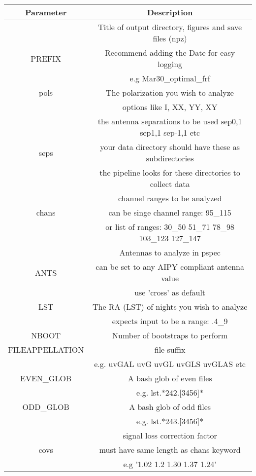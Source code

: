 \documentclass[onecolumn]{emulateapj}
\begin{document}
{{\begin{sidewaystable}[h]
\centering
\begin{tabular}{c | c}
Parameter & Description  \\
\hline 
     &  Title of output directory, figures and save files (npz)\\
PREFIX & Recommend adding the Date for easy logging \\
     & e.g Mar30\_optimal\_frf \\ \hline
pols & 	 The polarization you wish to analyze \\
	 & options like I, XX, YY, XY \\ \hline
     & the antenna separations to be used sep0,1 sep1,1 sep-1,1 etc\\
seps & your data directory should have these as subdirectories\\ 
	 & the pipeline looks for these directories to collect data\\ \hline
      & channel ranges to be analyzed \\
chans & can be singe channel range: 95\_115 \\
      & or list of ranges: 30\_50 51\_71 78\_98  103\_123 127\_147  \\ \hline     
	 & Antennas to analyze in pspec \\
ANTS	 & can be set to any AIPY compliant antenna value\\
	 & use 'cross' as default \\ \hline
LST  & The RA (LST) of nights you wish to analyze \\
 	& expects input to be a range: .4\_9 \\
 \hline
NBOOT & Number of bootstraps to perform \\ \hline
FILEAPPELLATION & file suffix \\
			    & e.g. uvGAL uvG uvGL uvGLS uvGLAS etc \\ \hline
EVEN\_GLOB & A bash glob of even files \\
		  & e.g. lst.*242.[3456]* \\ \hline
ODD\_GLOB & A bash glob of odd files \\
		  & e.g. lst.*243.[3456]* \\ \hline
	& signal loss correction factor \\
covs & must have same length as chans keyword\\
	 & e.g '1.02 1.2 1.30 1.37 1.24'\\ 

\end{tabular}
\end{sidewaystable}}}
\end{document}

